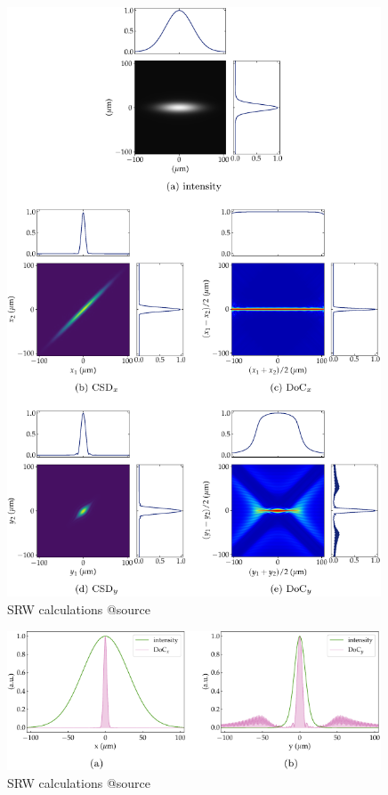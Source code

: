 \documentclass{iucr}              %
\begin{document}
\begin{figure}
    \label{fig:CSD_SRW_source}
    \includegraphics[width=0.99\textwidth]{SRW_CSD_source.pdf}
    \caption{SRW calculations @source}
\end{figure}
\begin{figure}
    \label{fig:CSD_SRW_vs_I_source}
    \includegraphics[width=0.99\textwidth]{CSD_SRW_vs_I_source.pdf}
    \caption{SRW calculations @source}
\end{figure}
\end{document}
